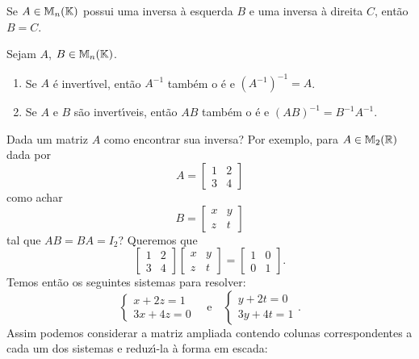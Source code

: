\begin{proposicao}
Se $A \in \mathbb{M}_{n}(\mathbb{K})$ possui uma inversa \`a esquerda $B$ e uma inversa \`a direita $C$, ent\~ao $B = C$.
\end{proposicao}

\begin{proposicao}
Sejam $A$, $B \in \mathbb{M}_{n}(\mathbb{K})$.
\begin{enumerate}
	\item Se $A$ \'e invert{\'\i}vel, ent\~ao $A^{-1}$ tamb\'em o \'e e $(A^{-1})^{-1} = A$.
	\item Se $A$ e $B$ s\~ao invert{\'\i}veis, ent\~ao $AB$ tamb\'em o \'e e $(AB)^{-1} = B^{-1}A^{-1}$.
\end{enumerate}
\end{proposicao}

Dada um matriz $A$ como encontrar sua inversa? Por exemplo, para $A \in \mathbb{M}_2(\mathbb{R})$ dada por
\[
A = \begin{bmatrix}
1 & 2\\
3 & 4
\end{bmatrix}
\]
como achar
\[
B = \begin{bmatrix}
x & y\\
z & t
\end{bmatrix}
\]
tal que $AB = BA = I_2$? Queremos que
\[
\begin{bmatrix}
1 & 2\\
3 & 4
\end{bmatrix}\begin{bmatrix}
x & y\\
z & t
\end{bmatrix} = \begin{bmatrix}
1 & 0\\
0 & 1
\end{bmatrix}.
\]
Temos ent\~ao os seguintes sistemas para resolver:
\[
\begin{cases}
x + 2z = 1\\
3x + 4z = 0
\end{cases} \quad \mbox{e}\quad \begin{cases}
y + 2t = 0\\
3y + 4t = 1
\end{cases}.
\]
Assim podemos considerar a matriz ampliada contendo colunas correspondentes a cada um dos sistemas e reduz{\'\i}-la \`a forma em escada:
